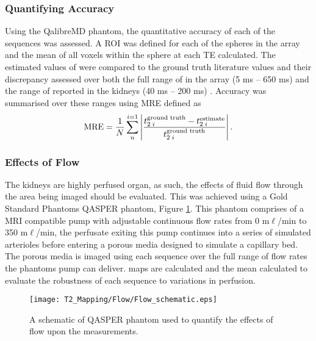 \subsubsection{Quantifying Accuracy}
Using the QalibreMD phantom, the quantitative accuracy of each of the sequences was assessed. A \ac{ROI} was defined for each of the spheres in the \ttwo array and the mean of all voxels within the sphere at each \ac{TE} calculated. The estimated values of \ttwo were compared to the ground truth literature values and their discrepancy assessed over both the full range of \ttwo in the array (5 ms – 650 ms) and the range of \ttwo reported in the kidneys (40 ms – 200 ms) \cite{wolf_magnetic_2018}. Accuracy was summarised over these ranges using \ac{MRE} defined as 
\begin{equation}
	\textup{MRE} = \frac{1}{N}\sum_{n}^{i=1}\left|  \frac{t_{2\; i}^{\textup{ground truth}} - t_{2\; i}^{\textup{estimate}}}{t_{2\; i}^{\textup{ground truth}}}\right|.
	\label{eq:t2_mre}
\end{equation}

\subsubsection{Effects of Flow}
The kidneys are highly perfused organ, as such, the effects of fluid flow through the area being imaged should be evaluated. This was achieved using a Gold Standard Phantoms \ac{QASPER} phantom, Figure \ref{fig:t2_flow_phantom_schematic}. This phantom comprises of a \ac{MRI} compatible pump with adjustable continuous flow rates from 0 m$\ell$/min to 350 m$\ell$/min, the perfusate exiting this pump continues into a series of simulated arterioles before entering a porous media designed to simulate a capillary bed. The porous media is imaged using each sequence over the full range of flow rates the phantoms pump can deliver. \ttwo maps are calculated and the mean \ttwo calculated to evaluate the robustness of each sequence to variations in perfusion.

\begin{figure}[H]
	\centering
	\texttt{[image: T2\_Mapping/Flow/Flow\_schematic.eps]}
	\caption{A schematic of \ac{QASPER} phantom used to quantify the effects of flow upon the \ttwo measurements.}
	\label{fig:t2_flow_phantom_schematic}	
\end{figure}

